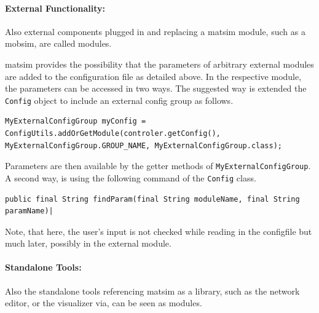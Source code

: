 \paragraph{External Functionality:} %
Also external components plugged in and replacing a \gls{matsim} module, such as a \gls{mobsim}, are called modules.

\gls{matsim} provides the possibility that the parameters of arbitrary external modules are added to the configuration file as detailed above. In the respective module, the parameters can be accessed in two ways. The suggested way is extended the \lstinline|Config| object to include an external config group as follows.
%
\begin{lstlisting}
MyExternalConfigGroup myConfig = ConfigUtils.addOrGetModule(controler.getConfig(), MyExternalConfigGroup.GROUP_NAME, MyExternalConfigGroup.class);
\end{lstlisting}
%
Parameters are then available by the getter methods of \lstinline|MyExternalConfigGroup|. A second way, is using the following command of the \lstinline|Config| class.
\begin{lstlisting}
public final String findParam(final String moduleName, final String paramName)| 
\end{lstlisting}
Note, that here, the user's input is not checked while reading in the \gls{configfile} but much later, possibly in the external module.


\paragraph{Standalone Tools:} %
Also the standalone tools referencing \gls{matsim} as a library, such as the network editor, or the visualizer via, can be seen as modules.


%

